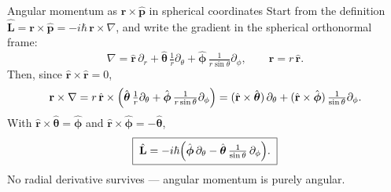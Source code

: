 \documentclass[aspectratio=169,10pt]{beamer}
\begin{document}
\begin{frame}{Angular momentum as $\mathbf r\times\hat{\mathbf p}$ in spherical coordinates}
Start from the definition $\hat{\mathbf L}=\mathbf r\times\hat{\mathbf p}=-i\hbar\,\mathbf r\times\nabla$, and write the gradient in the spherical orthonormal frame:
\begin{equation*}
\nabla=\hat{\mathbf r}\,\partial_r+\hat{\boldsymbol\theta}\,\tfrac1r\partial_\theta+\hat{\boldsymbol\phi}\,\tfrac{1}{r\sin\theta}\partial_\phi,
\qquad \mathbf r=r\,\hat{\mathbf r}.
\end{equation*}
Then, since $\hat{\mathbf r}\times\hat{\mathbf r}=0$,
\begin{equation*}
\mathbf r\times\nabla
= r\,\hat{\mathbf r}\times\Bigl(\hat{\boldsymbol\theta}\,\tfrac1r\partial_\theta+\hat{\boldsymbol\phi}\,\tfrac{1}{r\sin\theta}\partial_\phi\Bigr)
=(\hat{\mathbf r}\times\hat{\boldsymbol\theta})\,\partial_\theta+(\hat{\mathbf r}\times\hat{\boldsymbol\phi})\,\tfrac{1}{\sin\theta}\partial_\phi .
\end{equation*}
With $\hat{\mathbf r}\times\hat{\boldsymbol\theta}=\hat{\boldsymbol\phi}$ and $\hat{\mathbf r}\times\hat{\boldsymbol\phi}=-\hat{\boldsymbol\theta}$,
\begin{equation*}
\boxed{\;\hat{\mathbf L}=-i\hbar\Bigl(\hat{\boldsymbol\phi}\,\partial_\theta-\hat{\boldsymbol\theta}\,\tfrac{1}{\sin\theta}\,\partial_\phi\Bigr).\;}
\end{equation*}
No radial derivative survives --- angular momentum is purely angular.
\end{frame}
\end{document}
